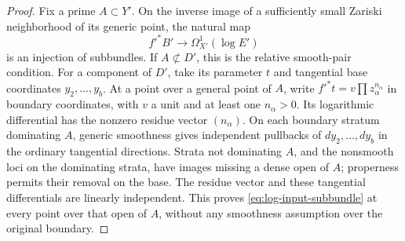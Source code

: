 \begin{proof}
Fix a prime $A\subset Y'$.  On the inverse image of a sufficiently
small Zariski neighborhood of its generic point, the natural map
\begin{equation}\label{eq:log-input-subbundle}
 f'^*B'\longrightarrow\Omega^1_{X'}(\log E')
\end{equation}
is an injection of subbundles.  If $A\not\subset D'$, this is the
relative smooth-pair condition.  For a component of $D'$, take its
parameter $t$ and tangential base coordinates $y_2,\ldots,y_b$.
At a point over a general point of $A$, write
$f'^*t=v\prod z_\alpha^{n_\alpha}$ in boundary coordinates, with
$v$ a unit and at least one $n_\alpha>0$.  Its logarithmic
differential has the nonzero residue vector $(n_\alpha)$.
On each boundary stratum dominating $A$, generic smoothness gives
independent pullbacks of $dy_2,\ldots,dy_b$ in the ordinary
tangential directions.  Strata not dominating $A$, and the
nonsmooth loci on the dominating strata, have images missing a
dense open of $A$; properness permits their removal on the base.
The residue vector and these tangential differentials are linearly
independent.  This proves \eqref{eq:log-input-subbundle} at every
point over that open of $A$, without any smoothness assumption
over the original boundary.


\end{proof}
